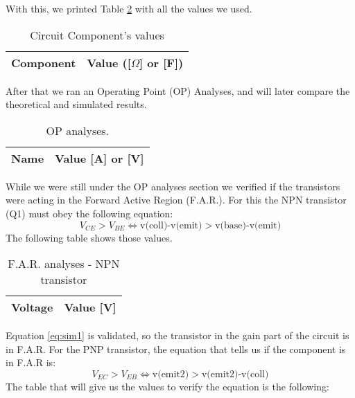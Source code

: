 With this, we printed Table \ref{tab:ngspice2} with all the values we used.

\FloatBarrier
\begin{table}[ht]
	\centering
	\begin{tabular}{|c|c|}
		\hline    
		{\bf Component} & {\bf Value ([$\Omega$] or [F])} \\ \hline
				
	\end{tabular}
	\caption{Circuit Component's values}
	\label{tab:ngspice1}
\end{table}
\FloatBarrier

After that we ran an Operating Point (OP) Analyses, and will later compare the theoretical and simulated results.

\FloatBarrier
\begin{table}[ht]
	\centering
	\begin{tabular}{|c|c|}
		\hline    
		{\bf Name} & {\bf Value [A] or [V]} \\ \hline
				
	\end{tabular}
	\caption{OP analyses.}
	\label{tab:ngspice2}
\end{table}
\FloatBarrier

While we were still under the OP analyses section we verified if the transistors were acting in the Forward Active Region (F.A.R.). For this the NPN transistor (Q1) must obey the following equation:
\begin{equation}
	V_{CE} > V_{BE} \Leftrightarrow \text{v(coll)-v(emit)}> \text{v(base)-v(emit)}
	\label{eq:sim1}
\end{equation}
 The following table shows those values.

\FloatBarrier
\begin{table}[ht]
	\centering
	\begin{tabular}{|c|c|}
		\hline    
		{\bf Voltage} & {\bf Value [V]} \\ \hline
				
	\end{tabular}
	\caption{F.A.R. analyses - NPN transistor}
	\label{tab:ngspice3}
\end{table}
\FloatBarrier
Equation \ref{eq:sim1} is validated, so the transistor in the gain part of the circuit is in F.A.R.
For the PNP transistor, the equation that tells us if the component is in F.A.R is:
\begin{equation}
	V_{EC} > V_{EB} \Leftrightarrow \text{v(emit2)}> \text{v(emit2)-v(coll)}
	\label{eq:sim2}
\end{equation}
The table that will give us the values to verify the equation is the following:

